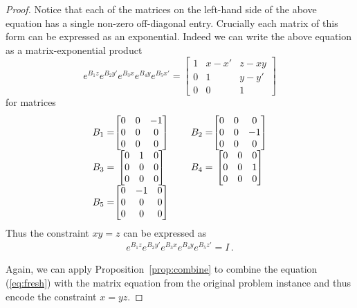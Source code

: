 \begin{proof}
Notice that each of the matrices on the left-hand side of the above
equation has a single non-zero off-diagonal entry.  Crucially each
matrix of this form can be expressed as an exponential.  Indeed we can
write the above equation as a matrix-exponential product
\[ e^{B_1z} e^{B_2y'} e^{B_3x} e^{B_4y} e^{B_5x'} = \begin{bmatrix}1&x-x'&z-xy\\0&1&y-y'\\0&0&1\end{bmatrix} \]
for matrices
\[\begin{array}{r@{}cp{.1cm}r@{}c}
B_1=&\begin{bmatrix}0&0&-1\\0&0&0\\0&0&0\end{bmatrix} &&
B_2=&\begin{bmatrix}0&0&0\\0&0&-1\\0&0&0\end{bmatrix} \\
B_3=&\begin{bmatrix}0&1&0\\0&0&0\\0&0&0\end{bmatrix} &&
B_4=&\begin{bmatrix}0&0&0\\0&0&1\\0&0&0\end{bmatrix} \\
B_5=&\begin{bmatrix}0&-1&0\\0&0&0\\0&0&0\end{bmatrix} &&
\end{array}\]
Thus the constraint $xy=z$ can be expressed as 
\begin{gather}
e^{B_1z} e^{B_2y'} e^{B_3x} e^{B_4y} e^{B_5z'} = I \, .
\label{eq:fresh}
\end{gather}

Again, we can apply Proposition~\ref{prop:combine} to combine the
equation (\ref{eq:fresh}) with the matrix equation from the original
problem instance and thus encode the constraint $x=yz$.


\end{proof}
